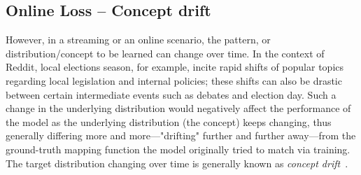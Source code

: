 
% 





\subsection{Online Loss -- Concept drift}

However, in a streaming or an online scenario, the pattern, or distribution/concept to be learned can change over time. In the context of Reddit, local elections season, for example, incite rapid shifts of popular topics regarding local legislation and internal policies; these shifts can also be drastic between certain intermediate events such as debates and election day. Such a change in the underlying distribution would negatively affect the performance of the model as the underlying distribution (the concept) keeps changing, thus generally differing more and more---"drifting" further and further away---from the ground-truth mapping function the model originally tried to match via training. The target distribution changing over time is generally known as \emph{concept drift}~\cite{Widmer1996}.

% 


